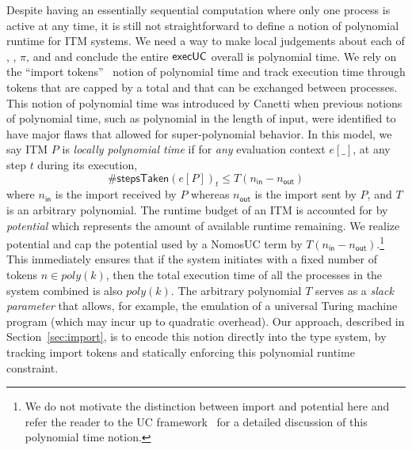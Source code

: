 Despite having an essentially sequential computation where only one process is active at any time,
it is still not straightforward to define a notion of polynomial runtime for ITM systems.
We need a way to make local judgements about each of \A, \Z, $\pi$, and \F and conclude the entire ${\mathsf {execUC}}$ overall is polynomial time. 
We rely on the ``import tokens''~\cite{canettiUC} notion of polynomial time and track execution time through tokens that
are capped by a total and that can be exchanged between processes. 
This notion of polynomial time was introduced by Canetti when previous notions of polynomial time, such as polynomial in the length of input, were identified to have major flaws that allowed for super-polynomial behavior.
In this model, we say ITM $P$ is \emph{locally polynomial time} if for \emph{any} evaluation context $e[\_]$, at any step $t$ during its execution,
\[
\#\textsf{stepsTaken}(e[P])_{t} \le T(n_{\textsf{in}} - n_{\textsf{out}})
\]
where $n_{\textsf{in}}$ is the import received by $P$ whereas $n_{\textsf{out}}$ is the import sent by $P$, and $T$ is an arbitrary polynomial.
The runtime budget of an ITM is accounted for by \emph{potential} which represents the amount of available runtime remaining.
We realize potential and cap the potential used by a NomosUC term by $T(n_\textsf{in}-n_\textsf{out})$.\footnote{We do not motivate the distinction between import and potential here and refer the reader to the UC framework~\cite{uc} for a detailed discussion of this polynomial time notion.}
This immediately ensures that if the system initiates with a fixed number of tokens $n \in poly(k)$, then the total execution time
of all the processes in the system combined is also $poly(k)$.
The arbitrary polynomial $T$ serves as a \emph{slack parameter} that allows, for example,
the emulation of a universal Turing machine program (which may incur up to quadratic overhead).
Our approach, described in Section~\ref{sec:import}, is to encode this notion directly into the type system, by tracking import tokens and statically enforcing this polynomial runtime constraint.

